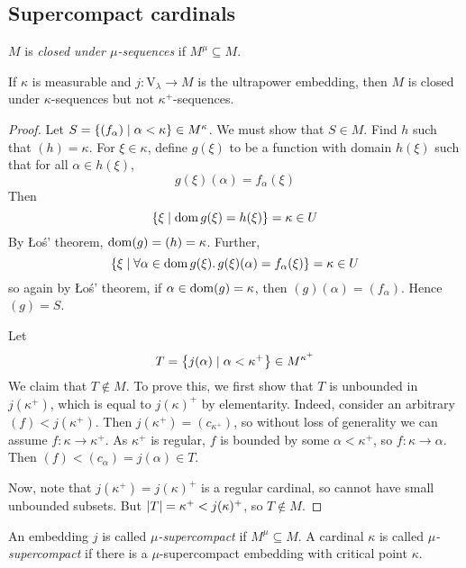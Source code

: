 \subsection{Supercompact cardinals}
\begin{definition}
    \( M \) is \emph{closed under \( \mu \)-sequences} if \( M^\mu \subseteq M \).
\end{definition}
\begin{theorem}
    If \( \kappa \) is measurable and \( j : \mathrm{V}_\lambda \to M \) is the ultrapower embedding, then \( M \) is closed under \( \kappa \)-sequences but not \( \kappa^+ \)-sequences.
\end{theorem}
\begin{proof}
    Let \( S = \qty{(f_\alpha) \mid \alpha < \kappa} \in M^\kappa \).
    We must show that \( S \in M \).
    Find \( h \) such that \( (h) = \kappa \).
    For \( \xi \in \kappa \), define \( g(\xi) \) to be a function with domain \( h(\xi) \) such that for all \( \alpha \in h(\xi) \),
    \[ g(\xi)(\alpha) = f_\alpha(\xi) \]
    Then
    \[ \qty{\xi \mid \operatorname{dom}g(\xi) = h(\xi)} = \kappa \in U \]
    By \L{}o\'s' theorem, \( \operatorname{dom} (g) = (h) = \kappa \).
    Further,
    \[ \qty{\xi \mid \forall \alpha \in \operatorname{dom}g(\xi).\, g(\xi)(\alpha) = f_\alpha(\xi)} = \kappa \in U \]
    so again by \L{}o\'s' theorem, if \( \alpha \in \operatorname{dom} (g) = \kappa \), then \( (g)(\alpha) = (f_\alpha) \).
    Hence \( (g) = S \).

    Let
    \[ T = \qty{j(\alpha) \mid \alpha < \kappa^+} \in M^{\kappa^+} \]
    We claim that \( T \notin M \).
    To prove this, we first show that \( T \) is unbounded in \( j(\kappa^+) \), which is equal to \( j(\kappa)^+ \) by elementarity.
    Indeed, consider an arbitrary \( (f) < j(\kappa^+) \).
    Then \( j(\kappa^+) = (c_{\kappa^+}) \), so without loss of generality we can assume \( f : \kappa \to \kappa^+ \).
    As \( \kappa^+ \) is regular, \( f \) is bounded by some \( \alpha < \kappa^+ \), so \( f : \kappa \to \alpha \).
    Then \( (f) < (c_\alpha) = j(\alpha) \in T \).

    Now, note that \( j(\kappa^+) = j(\kappa)^+ \) is a regular cardinal, so cannot have small unbounded subsets.
    But \( \abs{T} = \kappa^+ < j(\kappa)^+ \), so \( T \notin M \).
\end{proof}
\begin{definition}
    An embedding \( j \) is called \emph{\( \mu \)-supercompact} if \( M^\mu \subseteq M \).
    A cardinal \( \kappa \) is called \emph{\( \mu \)-supercompact} if there is a \( \mu \)-supercompact embedding with critical point \( \kappa \).
\end{definition}
